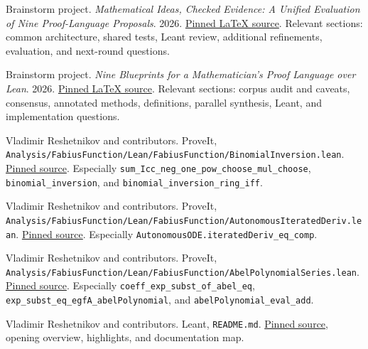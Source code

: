 \documentclass[11pt,a4paper]{article}
\newcommand{\code}[1]{\nolinkurl{#1}}
\newcommand{\src}[2]{\href{#1}{#2}}
\theoremstyle{definition}
\begin{document}
\begin{thebibliography}{99}
\small\raggedright
\setlength{\itemsep}{.12em}
\setlength{\parskip}{0pt}
Brainstorm project. \emph{Mathematical Ideas, Checked Evidence: A Unified
Evaluation of Nine Proof-Language Proposals}. 2026.
\src{https://github.com/VladimirReshetnikov/Brainstorm/blob/494be9d5ab41a5ae219fc6f800e6aee3c93bce39/docs/synthesis/unified-report.tex}{Pinned LaTeX source}.
Relevant sections: common architecture, shared tests, Leant review, additional
refinements, evaluation, and next-round questions.

Brainstorm project. \emph{Nine Blueprints for a Mathematician's Proof Language
over Lean}. 2026.
\src{https://github.com/VladimirReshetnikov/Brainstorm/blob/494be9d5ab41a5ae219fc6f800e6aee3c93bce39/docs/unified_report/unified_report.tex}{Pinned LaTeX source}.
Relevant sections: corpus audit and caveats, consensus, annotated methods,
definitions, parallel synthesis, Leant, and implementation questions.

Vladimir Reshetnikov and contributors. ProveIt,
\code{Analysis/FabiusFunction/Lean/FabiusFunction/BinomialInversion.lean}.
\src{https://github.com/VladimirReshetnikov/ProveIt/blob/24ce8bd743eaab64a91ce90725ea00f498d319d2/Analysis/FabiusFunction/Lean/FabiusFunction/BinomialInversion.lean}{Pinned source}.
Especially \code{sum_Icc_neg_one_pow_choose_mul_choose},
\code{binomial_inversion}, and \code{binomial_inversion_ring_iff}.

Vladimir Reshetnikov and contributors. ProveIt,
\code{Analysis/FabiusFunction/Lean/FabiusFunction/AutonomousIteratedDeriv.lean}.
\src{https://github.com/VladimirReshetnikov/ProveIt/blob/24ce8bd743eaab64a91ce90725ea00f498d319d2/Analysis/FabiusFunction/Lean/FabiusFunction/AutonomousIteratedDeriv.lean}{Pinned source}.
Especially \code{AutonomousODE.iteratedDeriv_eq_comp}.

Vladimir Reshetnikov and contributors. ProveIt,
\code{Analysis/FabiusFunction/Lean/FabiusFunction/AbelPolynomialSeries.lean}.
\src{https://github.com/VladimirReshetnikov/ProveIt/blob/24ce8bd743eaab64a91ce90725ea00f498d319d2/Analysis/FabiusFunction/Lean/FabiusFunction/AbelPolynomialSeries.lean}{Pinned source}.
Especially \code{coeff_exp_subst_of_abel_eq},
\code{exp_subst_eq_egfA_abelPolynomial}, and \code{abelPolynomial_eval_add}.

Vladimir Reshetnikov and contributors. Leant, \code{README.md}.
\src{https://github.com/VladimirReshetnikov/Leant/blob/3a40904be8a410d832d9ab6900b3d3e7b425eccb/README.md}{Pinned source}, opening overview, highlights, and documentation map.


\end{thebibliography}
\end{document}
